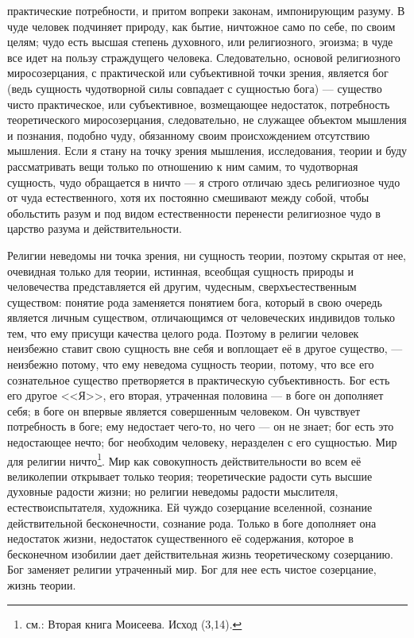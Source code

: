 \documentclass[12pt,oneside]{book}
\begin{document}
практические потребности, и притом вопреки законам, импонирующим разуму. В чуде человек подчиняет природу, как бытие, ничтожное само по себе, по своим целям; чудо есть высшая степень духовного, или религиозного, эгоизма; в чуде все идет на пользу страждущего человека. Следовательно, основой религиозного миросозерцания, с практической или субъективной точки зрения, является бог (ведь сущность чудотворной силы совпадает с сущностью бога) --- существо чисто практическое, или субъективное, возмещающее недостаток, потребность теоретического миросозерцания, следовательно, не служащее объектом мышления и познания, подобно чуду, обязанному своим происхождением отсутствию мышления. Если я стану на точку зрения мышления, исследования, теории и буду рассматривать вещи только по отношению к ним самим, то чудотворная сущность, чудо обращается в ничто --- я строго отличаю здесь религиозное чудо от чуда естественного, хотя их постоянно смешивают между собой, чтобы обольстить разум и под видом естественности перенести религиозное чудо в царство разума и действительности.





Религии неведомы ни точка зрения, ни сущность теории, поэтому скрытая от нее, очевидная только для теории, истинная, всеобщая сущность природы и человечества представляется ей другим, чудесным, сверхъестественным существом: понятие рода заменяется понятием бога, который в свою очередь является личным существом, отличающимся от человеческих индивидов только тем, что ему присущи качества целого рода. Поэтому в религии человек неизбежно ставит свою сущность вне себя и воплощает её в другое существо, --- неизбежно потому, что ему неведома сущность теории, потому, что все его сознательное существо претворяется в практическую субъективность. Бог есть его другое <<Я>>, его вторая, утраченная половина --- в боге он дополняет себя; в боге он впервые является совершенным человеком. Он чувствует потребность в боге; ему недостает чего-то, но чего --- он не знает; бог есть это недостающее нечто; бог необходим человеку, неразделен с его сущностью. Мир для религии ничто\ddag\let\svthefootnote\thefootnote\let\thefootnote\relax{}\let\thefootnote\svthefootnote\footnote{см.: Вторая книга Моисеева. Исход (3,14).}. Мир как совокупность действительности во всем её великолепии открывает только теория; теоретические радости суть высшие духовные радости жизни; но религии неведомы радости мыслителя, естествоиспытателя, художника. Ей чуждо созерцание вселенной, сознание действительной бесконечности, сознание рода. Только в боге дополняет она недостаток жизни, недостаток существенного её содержания, которое в бесконечном изобилии дает действительная жизнь теоретическому созерцанию. Бог заменяет религии утраченный мир. Бог для нее есть чистое созерцание, жизнь теории.
\end{document}
